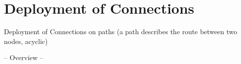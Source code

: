 \section{Deployment of Connections}
Deployment of Connections on paths (a path describes the route between two nodes, acyclic)

-- Overview --
